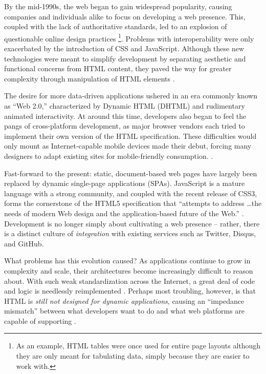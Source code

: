 \documentclass[12pt,letterpaper]{article}
\begin{document}
By the mid-1990s, the web began to gain widespread popularity, causing companies and individuals alike to focus on developing a web presence. This, coupled with the lack of authoritative standards, led to an explosion of questionable online design practices \footnote{As an example, HTML tables were once used for entire page layouts although they are only meant for tabulating data, simply because they are easier to work with.}. Problems with interoperability were only exacerbated by the introduction of CSS and JavaScript. Although these new technologies were meant to simplify development by separating aesthetic and functional concerns from HTML content, they paved the way for greater complexity through manipulation of HTML elements \cite{Sklar:2012}.

The desire for more data-driven applications ushered in an era commonly known as ``Web 2.0,'' characterized by Dynamic HTML (DHTML) and rudimentary animated interactivity. At around this time, developers also began to feel the pangs of cross-platform development, as major browser vendors each tried to implement their own version of the HTML specification. These difficulties would only mount as Internet-capable mobile devices made their debut, forcing many designers to adapt existing sites for mobile-friendly consumption. \cite{Schlensker:2014}.

Fast-forward to the present: static, document-based web pages have largely been replaced by dynamic single-page applications (SPAs). JavaScript is a mature language with a strong community, and coupled with the recent release of CSS3, forms the cornerstone of the HTML5 specification that ``attempts to address \ldots the needs of modern Web design and the application-based future of the Web.'' \cite[p.~14]{Sklar:2012}. Development is no longer simply about cultivating a web presence -- rather, there is a distinct culture of \emph{integration} with existing services such as Twitter, Disqus, and GitHub.

What problems has this evolution caused? As applications continue to grow in complexity and scale, their architectures become increasingly difficult to reason about. With such weak standardization across the Internet, a great deal of code and logic is needlessly reimplemented \cite{Schlensker:2014}. Perhaps most troubling, however, is that HTML is \emph{still not designed for dynamic applications}, causing an ``impedance mismatch'' between what developers want to do and what web platforms are capable of supporting \cite{Angular:Docs, Hunt:2014}.
\end{document}
